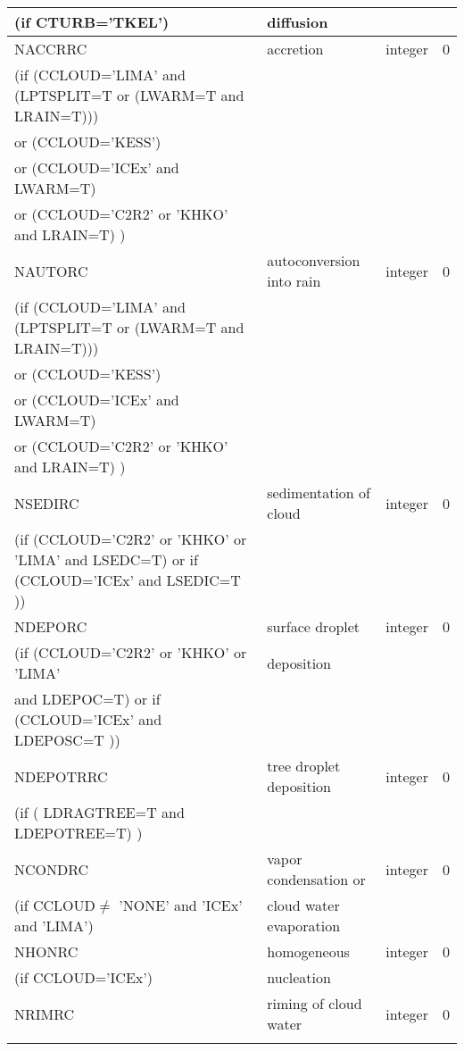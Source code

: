\begin{longtable} {|p{}|p{}|>{\centering}p{}|p{}<{\centering}|}
(if CTURB='TKEL') &diffusion &   &  \\\hline
NACCRRC  & accretion & integer  &  0 \index{NACCRC!\innam{NAM\_BU\_RRC}}\\ \nopagebreak
(if (CCLOUD='LIMA' and (LPTSPLIT=T or (LWARM=T and LRAIN=T))) & & & \\ \nopagebreak
 or (CCLOUD='KESS') & & & \\ \nopagebreak
 or (CCLOUD='ICEx' and LWARM=T) & & & \\ \nopagebreak
 or (CCLOUD='C2R2' or 'KHKO' and LRAIN=T) ) & & & \\ \hline
NAUTORC  & autoconversion into rain & integer  &  0 \index{NAUTORC!\innam{NAM\_BU\_RRC}}\\ \nopagebreak
(if (CCLOUD='LIMA' and (LPTSPLIT=T or (LWARM=T and LRAIN=T))) & & & \\ \nopagebreak
 or (CCLOUD='KESS') & & & \\ \nopagebreak
 or (CCLOUD='ICEx' and LWARM=T) & & & \\ \nopagebreak
 or (CCLOUD='C2R2' or 'KHKO' and LRAIN=T) ) & & & \\ \hline
NSEDIRC  & sedimentation of cloud   & integer  &  0 \index{NSEDIRC!\innam{NAM\_BU\_RRC}}\\ \nopagebreak
(if (CCLOUD='C2R2' or 'KHKO' or 'LIMA' and LSEDC=T) or if (CCLOUD='ICEx' and LSEDIC=T )) &  &   &   \\\hline
NDEPORC  & surface droplet   & integer  &  0 \index{NDEPORC!\innam{NAM\_BU\_RRC}}\\ \nopagebreak
(if (CCLOUD='C2R2' or 'KHKO' or 'LIMA' & deposition &   &  \\ \nopagebreak
 and LDEPOC=T) or if (CCLOUD='ICEx' and LDEPOSC=T )) &  &   &   \\\hline
NDEPOTRRC  & tree droplet deposition   & integer  &  0 \index{NDEPOTRRC!\innam{NAM\_BU\_RRC}}\\ \nopagebreak
(if ( LDRAGTREE=T and LDEPOTREE=T) ) &  &   &   \\\hline
NCONDRC  &vapor condensation or & integer  &  0 \index{NCONDRC!\innam{NAM\_BU\_RRC}}\\ \nopagebreak
(if CCLOUD$ \neq$ 'NONE' and 'ICEx' and 'LIMA') & cloud water evaporation& &   \\\hline
NHONRC   & homogeneous   & integer  &  0 \index{NHONRC!\innam{NAM\_BU\_RRC}}\\ \nopagebreak
(if CCLOUD='ICEx') &nucleation &   &  \\\hline
NRIMRC   & riming of cloud water   & integer  &  0 \index{NRIMRC!\innam{NAM\_BU\_RRC}}\\ \nopagebreak

\end{longtable}
